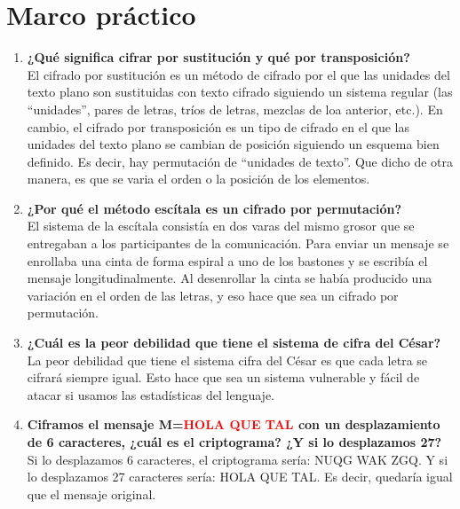 \documentclass{article}
\begin{document}
\newpage

\section{Marco práctico}
\justify
\begin{enumerate}


    \item \textbf{¿Qué significa cifrar por sustitución y qué por transposición?}\\
    El cifrado por sustitución es un método de cifrado por el que las unidades del texto plano son sustituidas con texto cifrado siguiendo un sistema regular (las ``unidades'', pares de letras, tríos de letras, mezclas de loa anterior, etc.). En cambio, el cifrado por transposición es un tipo de cifrado en el que las unidades del texto plano se cambian de posición siguiendo un esquema bien definido. Es decir, hay permutación de ``unidades de texto''. Que dicho de otra manera, es que se varia el orden o la posición de los elementos.

    \item \textbf{¿Por qué el método escítala es un cifrado por permutación?} \\
    El sistema de la escítala consistía en dos varas del mismo grosor que se entregaban a los participantes de la comunicación. Para enviar un mensaje se enrollaba una cinta de forma espiral a uno de los bastones y se escribía el mensaje longitudinalmente. Al desenrollar la cinta se había producido una variación en el orden  de las letras, y eso hace que sea un cifrado por permutación. 
    
    \item \textbf{¿Cuál es la peor debilidad que tiene el sistema de cifra del César?}\\
    La peor debilidad que tiene el sistema cifra del César es que cada letra se cifrará siempre igual. Esto hace que sea un sistema vulnerable y fácil de atacar si usamos las estadísticas del lenguaje. 
    
    \item \textbf{Ciframos el mensaje M=\textcolor{red}{HOLA QUE TAL} con un desplazamiento de 6 caracteres, ¿cuál es el criptograma? ¿Y si lo desplazamos 27?} \\
    Si lo desplazamos 6 caracteres, el criptograma sería: NUQG WAK ZGQ. Y si lo desplazamos 27 caracteres sería:   HOLA QUE TAL. Es decir, quedaría igual que el mensaje original.
    


\end{enumerate}
\end{document}

